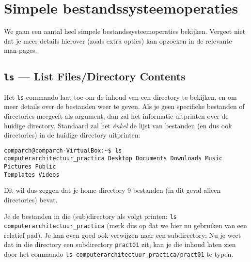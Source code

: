 \documentclass[a4paper,twoside,openany]{memoir}
\begin{document}
\chapter{Simpele bestandssysteemoperaties}

We gaan een aantal heel simpele bestandssysteemoperaties bekijken. Vergeet niet
dat je meer details hierover (zoals extra opties) kan opzoeken in de relevante
man-pages.

\section{\texttt{ls} --- List Files/Directory Contents}

Het \verb!ls!-commando laat toe om de inhoud van een directory te bekijken, en
om meer details over de  bestanden weer te geven. Als je geen specifieke
bestanden of directories meegeeft als argument, dan zal het informatie
uitprinten over de huidige
directory. Standaard zal het \emph{énkel} de lijst van bestanden (en dus ook
directories) in de huidige directory uitprinten:

\begin{verbatim}
comparch@comparch-VirtualBox:~$ ls
computerarchitectuur_practica Desktop Documents Downloads Music Pictures Public
Templates Videos
\end{verbatim}

Dit wil dus zeggen dat je home-directory 9 bestanden (in dit geval alleen
directories) bevat.

Je de bestanden in die (sub)directory als volgt printen: \verb!ls computerarchitectuur_practica!
(merk dus op dat we hier nu gebruiken van een relatief pad). Je kan even
goed ook verwijzen naar een subdirectory: Nu je weet dat in die directory
een subdirectory \verb!pract01!
zit, kan je die inhoud laten zien door het commando
\verb!ls computerarchitectuur_practica/pract01!
te typen.
\end{document}
